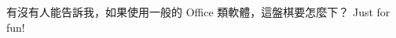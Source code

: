 \documentclass[12pt,a4paper]{article}
\begin{document}
\large{有沒有人能告訴我，如果使用一般的 Office 類軟體，這盤棋要怎麼下？
Just for fun! \smiley} 
\\[2cm]
\normalboard
\begin{position}
    
    
    
    
    
    
    
    
    
    
   
   
    
    
    
\end{position}
\end{document}
